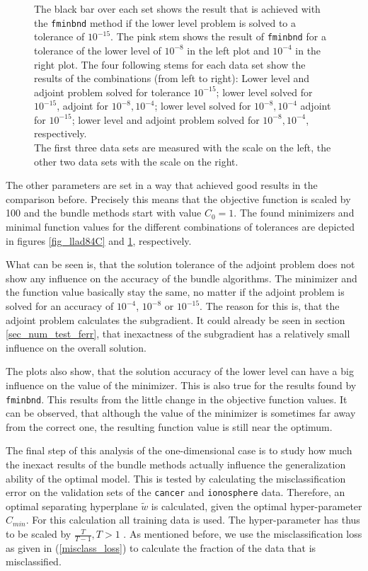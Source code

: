 \begin{figure}[ht]
{	The black bar over each set shows the result that is achieved with the \textup{\texttt{fminbnd}} method if the lower level problem is solved to a tolerance of \(10^{-15}\). The pink stem shows the result of \textup{\texttt{fminbnd}} for a tolerance of the lower level of \(10^{-8}\) in the left plot and \(10^{-4}\) in the right plot. The four following stems for each data set show the results of the combinations (from left to right): Lower level and adjoint problem solved for tolerance \(10^{-15}\); lower level solved for \(10^{-15}\), adjoint for \(10^{-8}, 10^{-4}\); lower level solved for \(10^{-8},10^{-4}\) adjoint for \(10^{-15}\); lower level and adjoint problem solved for \(10^{-8},10^{-4}\), respectively.\\
	The first three data sets are measured with the scale on the left, the other two data sets with the scale on the right.}%
	\label{fig_llad84f}%
\end{figure}

The other parameters are set in a way that achieved good results in the comparison before.
Precisely this means that the objective function is scaled by 100 and the bundle methods start with value \(C_0 = 1\). 
The found minimizers and minimal function values for the different combinations of tolerances are depicted in figures \ref{fig_llad84C} and \ref{fig_llad84f}, respectively.

What can be seen is, that the solution tolerance of the adjoint problem does not show any influence on the accuracy of the bundle algorithms. The minimizer and the function value basically stay the same, no matter if the adjoint problem is solved for an accuracy of \(10^{-4}\), \(10^{-8}\) or \(10^{-15}\).
The reason for this is, that the adjoint problem calculates the subgradient. It could already be seen in section \ref{sec_num_test_ferr}, that inexactness of the subgradient has a relatively small influence on the overall solution.

The plots also show, that the solution accuracy of the lower level can have a big influence on the value of the minimizer. This is also true for the results found by \texttt{fminbnd}.
This results from the little change in the objective function values. It can be observed, that although the value of the minimizer is sometimes far away from the correct one, the resulting function value is still near the optimum.

The final step of this analysis of the one-dimensional case is to study how much the inexact results of the bundle methods actually influence the generalization ability of the optimal model.
This is tested by calculating the misclassification error on the validation sets of the \texttt{cancer} and \texttt{ionosphere} data.
Therefore, an optimal separating hyperplane \(\tilde{w}\) is calculated, given the optimal hyper-parameter \(C_{min}\). For this calculation all training data is used. The hyper-parameter has thus to be scaled by \(\frac{T}{T-1}, T >1\) \cite[p. 47]{Kunapuli2008}. 
As mentioned before, we use the misclassification loss as given in (\ref{misclass_loss}) to calculate the fraction of the data that is misclassified.


